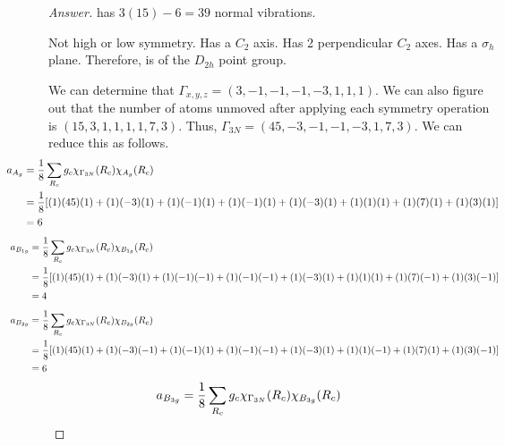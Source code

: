 \documentclass[../psets.tex]{subfiles}
\begin{document}
\begin{enumerate}[label={\Roman*)}]
\begin{enumerate}[label={\alph*)}]
\begin{proof}[Answer]
             has $3(15)-6=39$ normal vibrations.\par
            Not high or low symmetry. Has a $C_2$ axis. Has 2 perpendicular $C_2$ axes. Has a $\sigma_h$ plane. Therefore,  is of the $D_{2h}$ point group.\par
            We can determine that $\Gamma_{x,y,z}=(3,-1,-1,-1,-3,1,1,1)$. We can also figure out that the number of atoms unmoved after applying each symmetry operation is $(15,3,1,1,1,1,7,3)$. Thus, $\Gamma_{3N}=(45,-3,-1,-1,-3,1,7,3)$. We can reduce this as follows.
            \begin{align*}
                \hspace{-4em}a_{A_g}    &= \frac{1}{8}\sum_{R_c}g_c\chi_{\Gamma_{3N}}(R_c)\chi_{A_g}(R_c)\\
                \hspace{-4em}&= \frac{1}{8}[(1)(45)(1)+(1)(-3)(1)+(1)(-1)(1)+(1)(-1)(1)+(1)(-3)(1)+(1)(1)(1)+(1)(7)(1)+(1)(3)(1)]\\
                \hspace{-4em}&= 6
            \end{align*}
            \begin{align*}
                \hspace{-4em}a_{B_{1g}} &= \frac{1}{8}\sum_{R_c}g_c\chi_{\Gamma_{3N}}(R_c)\chi_{B_{1g}}(R_c)\\
                \hspace{-4em}&= \frac{1}{8}[(1)(45)(1)+(1)(-3)(1)+(1)(-1)(-1)+(1)(-1)(-1)+(1)(-3)(1)+(1)(1)(1)+(1)(7)(-1)+(1)(3)(-1)]\\
                \hspace{-4em}&= 4
            \end{align*}
            \begin{align*}
                \hspace{-4em}a_{B_{2g}} &= \frac{1}{8}\sum_{R_c}g_c\chi_{\Gamma_{3N}}(R_c)\chi_{B_{2g}}(R_c)\\
                \hspace{-4em}&= \frac{1}{8}[(1)(45)(1)+(1)(-3)(-1)+(1)(-1)(1)+(1)(-1)(-1)+(1)(-3)(1)+(1)(1)(-1)+(1)(7)(1)+(1)(3)(-1)]\\
                \hspace{-4em}&= 6
            \end{align*}
            \begin{align*}
                \hspace{-4em}a_{B_{3g}} &= \frac{1}{8}\sum_{R_c}g_c\chi_{\Gamma_{3N}}(R_c)\chi_{B_{3g}}(R_c)\\

\end{align*}
\end{proof}
\end{enumerate}
\end{enumerate}
\end{document}
